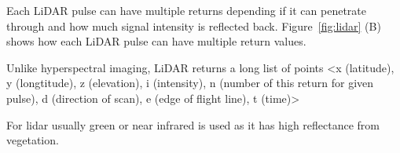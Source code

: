 Each LiDAR pulse can have multiple returns depending if it can penetrate through and how much signal intensity is reflected back. Figure~\ref{fig:lidar} (B) shows how each LiDAR pulse can have multiple return values.


Unlike hyperspectral imaging, LiDAR returns a long list of points <x (latitude), y (longtitude), z (elevation), i (intensity), n (number of this return for given pulse), d (direction of scan), e (edge of flight line), t (time)>



For lidar usually green or near infrared is used as it has high reflectance from vegetation.





%
%















